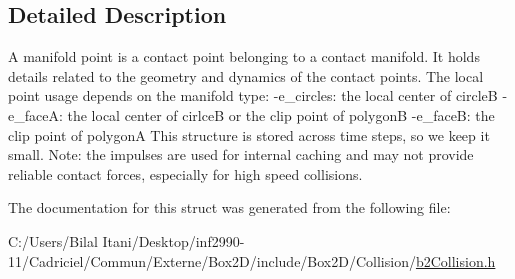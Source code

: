 \subsection{Detailed Description}
A manifold point is a contact point belonging to a contact manifold. It holds details related to the geometry and dynamics of the contact points. The local point usage depends on the manifold type\+: -\/e\+\_\+circles\+: the local center of circleB -\/e\+\_\+faceA\+: the local center of cirlceB or the clip point of polygonB -\/e\+\_\+faceB\+: the clip point of polygonA This structure is stored across time steps, so we keep it small. Note\+: the impulses are used for internal caching and may not provide reliable contact forces, especially for high speed collisions. 

The documentation for this struct was generated from the following file\+:\begin{DoxyCompactItemize}
\item 
C\+:/\+Users/\+Bilal Itani/\+Desktop/inf2990-\/11/\+Cadriciel/\+Commun/\+Externe/\+Box2\+D/include/\+Box2\+D/\+Collision/\hyperlink{b2_collision_8h}{b2\+Collision.\+h}\end{DoxyCompactItemize}
